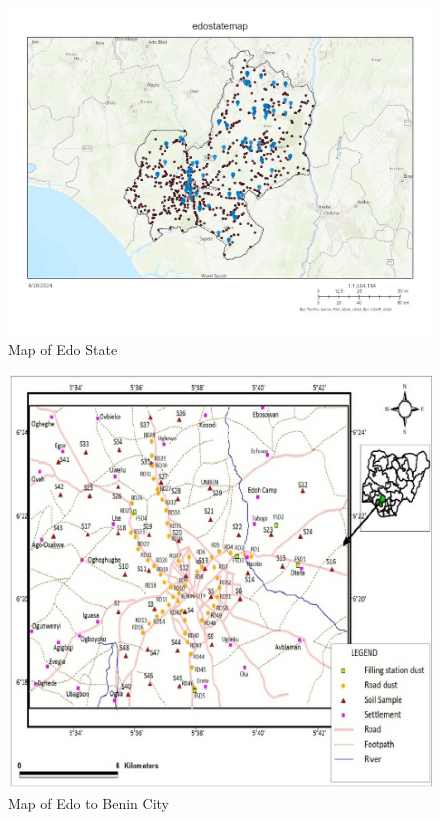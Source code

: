 \begin{figure}[h!]
    \centering
    \includegraphics[width=1\linewidth]{edostate_updated.jpg}
    \caption{Map of Edo State}
    \label{fig:edostatemap}
\end{figure}
\vspace{1cm}
\begin{figure}[h!]
    \centering
    \includegraphics[width=1\linewidth]{edobenin.png}
    \caption{Map of Edo to Benin City}
    \label{fig:edobeninstatemap}
\end{figure}

